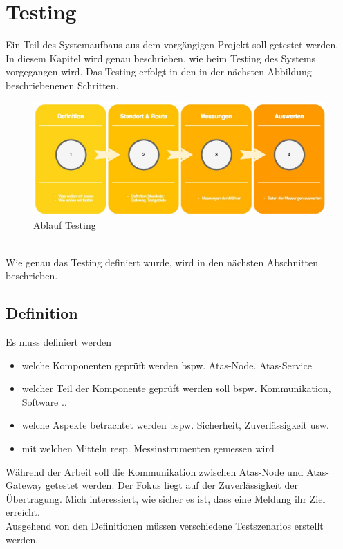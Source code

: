 \documentclass[11pt,english,german]{report}
\theoremstyle{definition}
\begin{document}
\section{Testing}
Ein Teil des Systemaufbaus aus dem vorgängigen Projekt soll getestet werden.\\[0.3cm]
In diesem Kapitel wird genau beschrieben, wie beim Testing des Systems vorgegangen wird.
Das Testing erfolgt in den in der nächsten Abbildung beschriebenenen Schritten.
\begin{figure}[h]
	\centering
	\includegraphics[width=\textwidth]{img/projectFlow_testing.jpg}
	\caption[Flowchart Testing]
	{Ablauf Testing}
\end{figure}
\\ 
Wie genau das Testing definiert wurde, wird in den nächsten Abschnitten beschrieben.

\newpage
\subsection{Definition}
Es muss definiert werden
\begin{itemize}
	\item welche Komponenten geprüft werden bspw. Atas-Node. Atas-Service
	\item welcher Teil der Komponente geprüft werden soll bspw. Kommunikation, Software ..
	\item welche Aspekte betrachtet werden bspw. Sicherheit, Zuverlässigkeit usw.
	\item mit welchen Mitteln resp. Messinstrumenten gemessen wird
\end{itemize}
Während der Arbeit soll die Kommunikation zwischen Atas-Node und Atas-Gateway getestet werden. Der Fokus liegt auf der Zuverlässigkeit der Übertragung. Mich interessiert, wie sicher es ist, dass eine Meldung ihr Ziel erreicht.\\[0.3cm]
Ausgehend von den Definitionen müssen verschiedene Testszenarios erstellt werden. 
\end{document}
